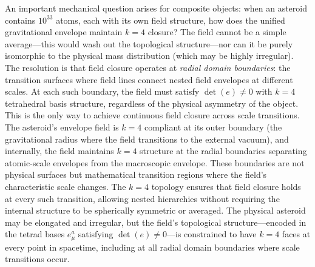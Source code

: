 
An important mechanical question arises for composite objects: when an asteroid contains $10^{33}$ atoms, each with its own field structure, how does the unified gravitational envelope maintain $k=4$ closure? The field cannot be a simple average—this would wash out the topological structure—nor can it be purely isomorphic to the physical mass distribution (which may be highly irregular). The resolution is that field closure operates at \emph{radial domain boundaries}: the transition surfaces where field lines connect nested field envelopes at different scales. At each such boundary, the field must satisfy $\det(e) \neq 0$ with $k=4$ tetrahedral basis structure, regardless of the physical asymmetry of the object. This is the only way to achieve continuous field closure across scale transitions. The asteroid's envelope field is $k=4$ compliant at its outer boundary (the gravitational radius where the field transitions to the external vacuum), and internally, the field maintains $k=4$ structure at the radial boundaries separating atomic-scale envelopes from the macroscopic envelope. These boundaries are not physical surfaces but mathematical transition regions where the field's characteristic scale changes. The $k=4$ topology ensures that field closure holds at every such transition, allowing nested hierarchies without requiring the internal structure to be spherically symmetric or averaged. The physical asteroid may be elongated and irregular, but the field's topological structure—encoded in the tetrad bases $e_\mu^a$ satisfying $\det(e) \neq 0$—is constrained to have $k=4$ faces at every point in spacetime, including at all radial domain boundaries where scale transitions occur.
